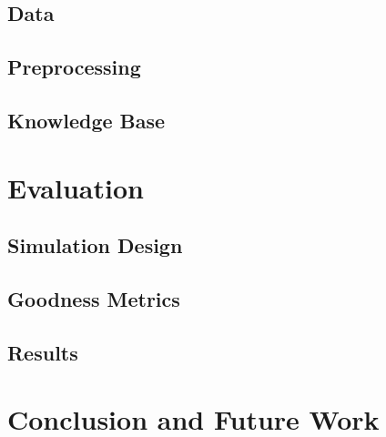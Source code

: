\documentclass{iitkthesis}
\begin{document}
 \section{Data}
 \section{Preprocessing}
 \section{Knowledge Base}
 \label{kbase}
 \chapter{Evaluation}
 \label{evaluation}

 \section{Simulation Design}
 \section{Goodness Metrics}
 \section{Results}
 \chapter{Conclusion and Future Work}


\end{document}
